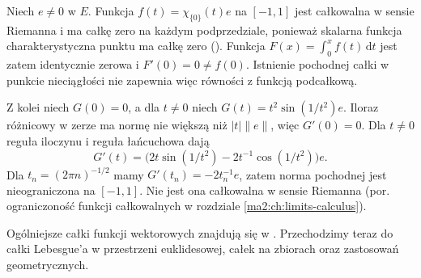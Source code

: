 \begin{przyklad}
\label{ma2:ex:primitive-scope}
Niech $e\ne0$ w $E$. Funkcja
$f(t)=\chi_{\{0\}}(t)e$ na $[-1,1]$
jest całkowalna w sensie Riemanna
i ma całkę zero na każdym podprzedziale,
ponieważ skalarna funkcja charakterystyczna
punktu ma całkę zero
().
Funkcja $F(x)=\int_0^x f(t)\,\mathrm dt$
jest zatem identycznie zerowa i
$F'(0)=0\ne f(0)$. Istnienie pochodnej
całki w punkcie nieciągłości nie zapewnia
więc równości z funkcją podcałkową.

Z kolei niech $G(0)=0$, a dla $t\ne0$
niech $G(t)=t^2\sin(1/t^2)e$.
Iloraz różnicowy w zerze ma normę
nie większą niż $|t|\|e\|$, więc $G'(0)=0$.
Dla $t\ne0$ reguła iloczynu i reguła
łańcuchowa dają
\[
 G'(t)=\bigl(2t\sin(1/t^2)
             -2t^{-1}\cos(1/t^2)\bigr)e.
\]
Dla $t_n=(2\pi n)^{-1/2}$ mamy
$G'(t_n)=-2t_n^{-1}e$, zatem norma
pochodnej jest nieograniczona na $[-1,1]$.
Nie jest ona całkowalna w sensie Riemanna
(por. ograniczoność funkcji całkowalnych
w rozdziale \ref{ma2:ch:limits-calculus}).
\end{przyklad}

Ogólniejsze całki funkcji wektorowych znajdują się
w .
Przechodzimy teraz do całki Lebesgue'a w przestrzeni
euklidesowej, całek na zbiorach oraz zastosowań
geometrycznych.
